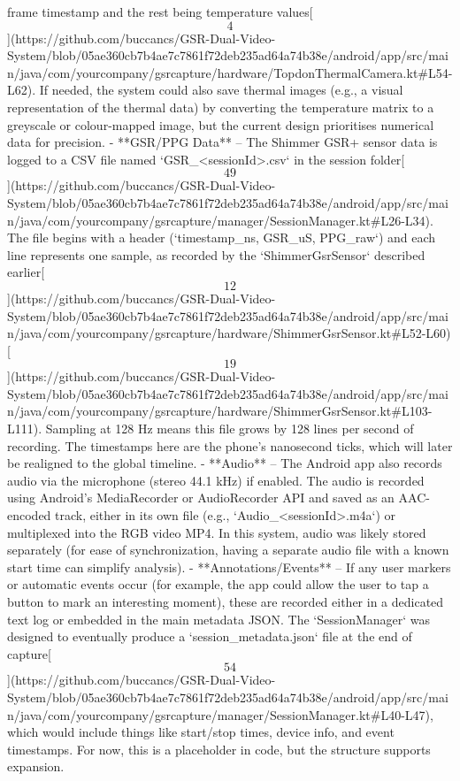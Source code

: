 \documentclass[12pt,a4paper]{article}
\begin{document}
{frame timestamp and the rest being temperature
values[\[4\]](https://github.com/buccancs/GSR-Dual-Video-System/blob/05ae360cb7b4ae7c7861f72deb235ad64a74b38e/android/app/src/main/java/com/yourcompany/gsrcapture/hardware/TopdonThermalCamera.kt#L54-L62).
If needed, the system could also save thermal images (e.g., a visual
representation of the thermal data) by converting the temperature matrix
to a greyscale or colour-mapped image, but the current design prioritises
numerical data for precision. - **GSR/PPG Data** -- The Shimmer GSR+
sensor data is logged to a CSV file named `GSR_<sessionId>.csv` in the
session
folder[\[49\]](https://github.com/buccancs/GSR-Dual-Video-System/blob/05ae360cb7b4ae7c7861f72deb235ad64a74b38e/android/app/src/main/java/com/yourcompany/gsrcapture/manager/SessionManager.kt#L26-L34).
The file begins with a header (`timestamp_ns, GSR_uS, PPG_raw`) and each
line represents one sample, as recorded by the `ShimmerGsrSensor`
described
earlier[\[12\]](https://github.com/buccancs/GSR-Dual-Video-System/blob/05ae360cb7b4ae7c7861f72deb235ad64a74b38e/android/app/src/main/java/com/yourcompany/gsrcapture/hardware/ShimmerGsrSensor.kt#L52-L60)[\[19\]](https://github.com/buccancs/GSR-Dual-Video-System/blob/05ae360cb7b4ae7c7861f72deb235ad64a74b38e/android/app/src/main/java/com/yourcompany/gsrcapture/hardware/ShimmerGsrSensor.kt#L103-L111).
Sampling at 128 Hz means this file grows by 128 lines per second of
recording. The timestamps here are the phone's nanosecond ticks, which
will later be realigned to the global timeline. - **Audio** -- The
Android app also records audio via the microphone (stereo 44.1 kHz) if
enabled. The audio is recorded using Android's MediaRecorder or
AudioRecorder API and saved as an AAC-encoded track, either in its own
file (e.g., `Audio_<sessionId>.m4a`) or multiplexed into the RGB video
MP4. In this system, audio was likely stored separately (for ease of
synchronization, having a separate audio file with a known start time
can simplify analysis). - **Annotations/Events** -- If any user markers
or automatic events occur (for example, the app could allow the user to
tap a button to mark an interesting moment), these are recorded either
in a dedicated text log or embedded in the main metadata JSON. The
`SessionManager` was designed to eventually produce a
`session_metadata.json` file at the end of
capture[\[54\]](https://github.com/buccancs/GSR-Dual-Video-System/blob/05ae360cb7b4ae7c7861f72deb235ad64a74b38e/android/app/src/main/java/com/yourcompany/gsrcapture/manager/SessionManager.kt#L40-L47),
which would include things like start/stop times, device info, and event
timestamps. For now, this is a placeholder in code, but the structure
supports expansion.

}
\end{document}
